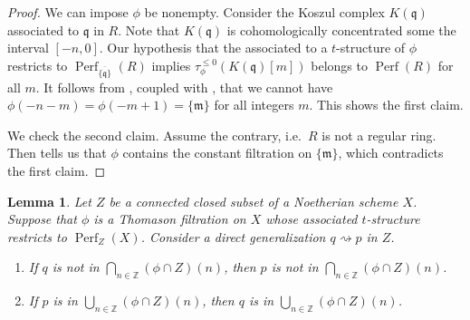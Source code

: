 \documentclass[11pt]{amsart}
\theoremstyle{plain}
\newtheorem{lemma}[theorem]{Lemma}
\theoremstyle{definition}
\numberwithin{equation}{section}
\numberwithin{theorem}{section}
\begin{document}
\begin{proof}
    We can impose $\phi$ be nonempty. Consider the Koszul complex $K(\mathfrak{q})$ associated to $\mathfrak{q}$ in $R$. Note that $K(\mathfrak{q})$ is cohomologically concentrated some the interval $[-n,0]$. Our hypothesis that the associated to a $t$-structure of $\phi$ restricts to $\operatorname{Perf}_{\overline{\{ \mathfrak{q}\} }}(R)$ implies $\tau_\phi^{\leq 0} ( K(\mathfrak{q}) [m] )$ belongs to $\operatorname{Perf}(R)$ for all $m$. It follows from , coupled with , that we cannot have $\phi(-n-m) = \phi(-m + 1)= \{\mathfrak{m}\}$ for all integers $m$. This shows the first claim.

    We check the second claim. Assume the contrary, i.e.\ $R$ is not a regular ring. Then  tells us that $\phi$ contains the constant filtration on $\{\mathfrak{m}\}$, which contradicts the first claim.
\end{proof}

\begin{lemma}\label{lem:behavior_for_supports_intersection_union}
    Let $Z$ be a connected closed subset of a Noetherian scheme $X$. Suppose that $\phi$ is a Thomason filtration on $X$ whose associated $t$-structure restricts to $\operatorname{Perf}_Z(X)$. Consider a direct generalization $q\rightsquigarrow p$ in $Z$.
    \begin{enumerate}
        \item If $q$ is not in $\bigcap_{n\in \mathbb{Z}} (\phi \cap Z)(n)$, then $p$ is not in $\bigcap_{n\in \mathbb{Z}} (\phi\cap Z)(n)$. 
        \item If $p$ is in $\bigcup_{n\in \mathbb{Z}} (\phi \cap Z)(n)$, then $q$ is in $\bigcup_{n\in \mathbb{Z}} (\phi \cap Z)(n)$. 
    \end{enumerate}
\end{lemma}
\end{document}
